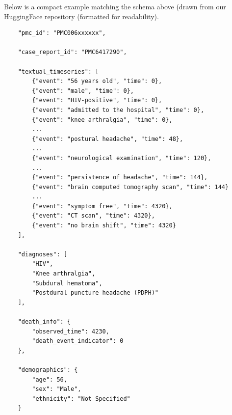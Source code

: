 \noindent Below is a compact example matching the schema above (drawn from our HuggingFace repository (formatted for readability).

\begin{tcolorbox}[
  colback=gray!5,
  colframe=gray!100,
  title=Example JSON entry,
  boxrule=2pt,
  enhanced,
  breakable,                %
  before skip=8pt,          %
  after skip=8pt,           %
  pad at break*=2mm,        %
  fontupper=\scriptsize,
  title after break={Example JSON entry} %
]

\begin{verbatim}
    "pmc_id": "PMC006xxxxxx",
    
    "case_report_id": "PMC6417290",
    
    "textual_timeseries": [
        {"event": "56 years old", "time": 0}, 
        {"event": "male", "time": 0}, 
        {"event": "HIV-positive", "time": 0}, 
        {"event": "admitted to the hospital", "time": 0}, 
        {"event": "knee arthralgia", "time": 0}, 
        ...
        {"event": "postural headache", "time": 48}, 
        ...
        {"event": "neurological examination", "time": 120}, 
        ...
        {"event": "persistence of headache", "time": 144}, 
        {"event": "brain computed tomography scan", "time": 144}
        ...
        {"event": "symptom free", "time": 4320}, 
        {"event": "CT scan", "time": 4320}, 
        {"event": "no brain shift", "time": 4320}
    ],
    
    "diagnoses": [
        "HIV", 
        "Knee arthralgia", 
        "Subdural hematoma", 
        "Postdural puncture headache (PDPH)"
    ],
    
    "death_info": {
        "observed_time": 4230,
        "death_event_indicator": 0
    },
    
    "demographics": {
        "age": 56,
        "sex": "Male",
        "ethnicity": "Not Specified"
    }
\end{verbatim}

\end{tcolorbox}
